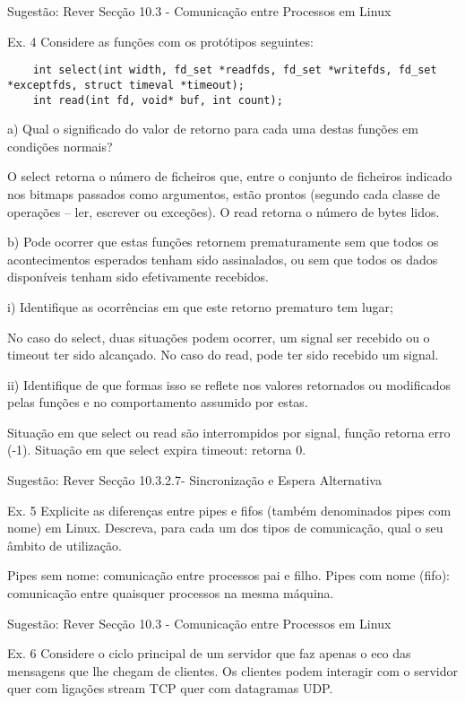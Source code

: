 \documentclass[11pt]{article}
\begin{document}
Sugestão: Rever Secção 10.3 - Comunicação entre Processos em Linux


Ex. 4 Considere as funções com os protótipos seguintes:

\begin{lstlisting}
    int select(int width, fd_set *readfds, fd_set *writefds, fd_set *exceptfds, struct timeval *timeout);
    int read(int fd, void* buf, int count);
\end{lstlisting}

a) Qual o significado do valor de retorno para cada uma destas funções em condições normais?

O select retorna o número de ficheiros que, entre o conjunto de ficheiros indicado nos bitmaps passados como argumentos, estão prontos (segundo cada classe de operações – ler, escrever ou exceções). O read retorna o número de bytes lidos.

b) Pode ocorrer que estas funções retornem prematuramente sem que todos os acontecimentos esperados tenham sido assinalados, ou sem que todos os dados disponíveis tenham sido efetivamente recebidos.

i) Identifique as ocorrências em que este retorno prematuro tem lugar;

No caso do select, duas situações podem ocorrer, um signal ser recebido ou o timeout ter sido alcançado. No caso do read, pode ter sido recebido um signal.

ii) Identifique de que formas isso se reflete nos valores retornados ou modificados pelas funções e no comportamento assumido por estas.

Situação em que select ou read são interrompidos por signal, função retorna erro (-1). Situação em que select expira timeout: retorna 0.

Sugestão: Rever Secção 10.3.2.7- Sincronização e Espera Alternativa


Ex. 5 Explicite as diferenças entre pipes e fifos (também denominados pipes com nome) em Linux. Descreva, para cada um dos tipos de comunicação, qual o seu âmbito de utilização.

Pipes sem nome: comunicação entre processos pai e filho.
Pipes com nome (fifo): comunicação entre quaisquer processos na mesma máquina.

Sugestão: Rever Secção 10.3 - Comunicação entre Processos em Linux


Ex. 6 Considere o ciclo principal de um servidor que faz apenas o eco das mensagens que lhe chegam de clientes. Os clientes podem interagir com o servidor quer com ligações stream TCP quer com datagramas UDP.
\end{document}

